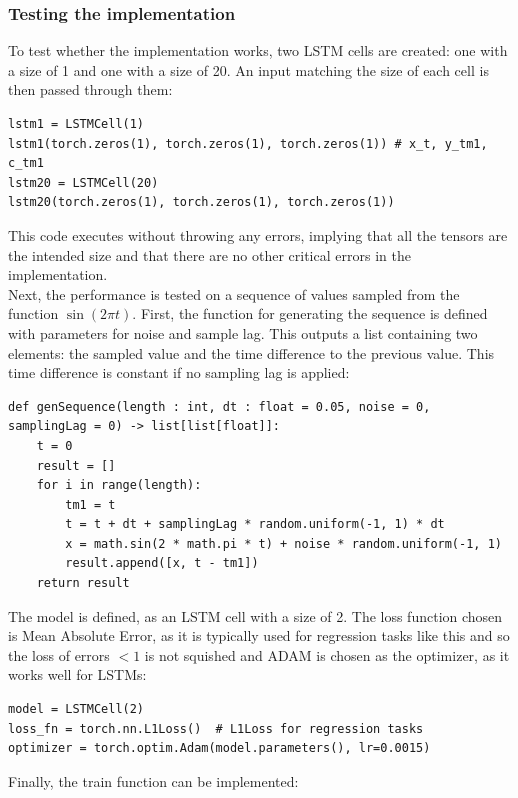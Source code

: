 \documentclass[twoside,a4paper,10pt,DIV=12,BCOR=12mm]{scrartcl}
\begin{document}
\subsubsection{Testing the implementation}
To test whether the implementation works, two LSTM cells are created: one with a size of 1 and one with a size of 20. An input matching the size of each cell is then passed through them:\cite{pytorch-lstm}
\begin{lstlisting}
lstm1 = LSTMCell(1)
lstm1(torch.zeros(1), torch.zeros(1), torch.zeros(1)) # x_t, y_tm1, c_tm1
lstm20 = LSTMCell(20)
lstm20(torch.zeros(1), torch.zeros(1), torch.zeros(1))
\end{lstlisting}
This code executes without throwing any errors, implying that all the tensors are the intended size and that there are no other critical errors in the implementation.\\
Next, the performance is tested on a sequence of values sampled from the function \begin{math}\sin(2\pi t)\end{math}. 
First, the function for generating the sequence is defined with parameters for noise and sample lag. This outputs a list containing two elements: the sampled value and the time difference to the previous value. This time difference is constant if no sampling lag is applied:
\begin{lstlisting}
def genSequence(length : int, dt : float = 0.05, noise = 0, samplingLag = 0) -> list[list[float]]:
    t = 0
    result = []
    for i in range(length):
        tm1 = t
        t = t + dt + samplingLag * random.uniform(-1, 1) * dt
        x = math.sin(2 * math.pi * t) + noise * random.uniform(-1, 1)
        result.append([x, t - tm1])
    return result
\end{lstlisting}
The model is defined, as an LSTM cell with a size of 2. The loss function chosen is Mean Absolute Error, as it is typically used for regression tasks like this and so the loss of errors \begin{math}<1\end{math} is not squished and ADAM is chosen as the optimizer, as it works well for LSTMs:\cite{chang2018adamlstm,willmott2005losses,terven2025losses}
\begin{lstlisting}
model = LSTMCell(2)
loss_fn = torch.nn.L1Loss()  # L1Loss for regression tasks 
optimizer = torch.optim.Adam(model.parameters(), lr=0.0015)
\end{lstlisting}
Finally, the train function can be implemented:
\end{document}
